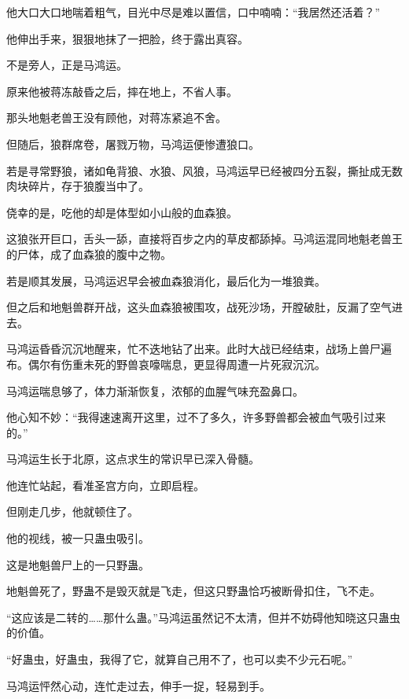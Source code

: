 \begin{this_body}
他大口大口地喘着粗气，目光中尽是难以置信，口中喃喃：“我居然还活着？”

他伸出手来，狠狠地抹了一把脸，终于露出真容。

不是旁人，正是马鸿运。

原来他被蒋冻敲昏之后，摔在地上，不省人事。

那头地魁老兽王没有顾他，对蒋冻紧追不舍。

但随后，狼群席卷，屠戮万物，马鸿运便惨遭狼口。

若是寻常野狼，诸如龟背狼、水狼、风狼，马鸿运早已经被四分五裂，撕扯成无数肉块碎片，存于狼腹当中了。

侥幸的是，吃他的却是体型如小山般的血森狼。

这狼张开巨口，舌头一舔，直接将百步之内的草皮都舔掉。马鸿运混同地魁老兽王的尸体，成了血森狼的腹中之物。

若是顺其发展，马鸿运迟早会被血森狼消化，最后化为一堆狼粪。

但之后和地魁兽群开战，这头血森狼被围攻，战死沙场，开膛破肚，反漏了空气进去。

马鸿运昏昏沉沉地醒来，忙不迭地钻了出来。此时大战已经结束，战场上兽尸遍布。偶尔有伤重未死的野兽哀嚎喘息，更显得周遭一片死寂沉沉。

马鸿运喘息够了，体力渐渐恢复，浓郁的血腥气味充盈鼻口。

他心知不妙：“我得速速离开这里，过不了多久，许多野兽都会被血气吸引过来的。”

马鸿运生长于北原，这点求生的常识早已深入骨髓。

他连忙站起，看准圣宫方向，立即启程。

但刚走几步，他就顿住了。

他的视线，被一只蛊虫吸引。

这是地魁兽尸上的一只野蛊。

地魁兽死了，野蛊不是毁灭就是飞走，但这只野蛊恰巧被断骨扣住，飞不走。

“这应该是二转的……那什么蛊。”马鸿运虽然记不太清，但并不妨碍他知晓这只蛊虫的价值。

“好蛊虫，好蛊虫，我得了它，就算自己用不了，也可以卖不少元石呢。”

马鸿运怦然心动，连忙走过去，伸手一捉，轻易到手。

\end{this_body}

